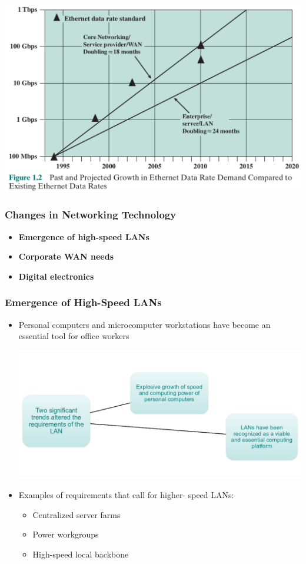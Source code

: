 \documentclass[pdflatex,compress]{beamer}
\begin{document}
\begin{frame}
	\begin{center}
		\includegraphics[height=0.8\textheight]{img/img03}
	\end{center}
\end{frame}

\begin{frame}
	\frametitle{Changes in Networking Technology}
	\begin{itemize}
		\item \textbf{Emergence of high-speed LANs}
		\item \textbf{Corporate WAN needs}
		\item \textbf{Digital electronics}
	\end{itemize}
\end{frame}

\begin{frame}
	\frametitle{Emergence of High-Speed LANs}
	\begin{itemize}
		\item Personal computers and microcomputer workstations have become an essential tool for office workers
		\begin{center}
			\includegraphics[height=0.5\textheight]{img/img04}
		\end{center}
		\item Examples of requirements that call for higher- speed LANs:
		\begin{itemize}
			\item Centralized server farms
			\item Power workgroups
			\item High-speed local backbone
		\end{itemize}
	\end{itemize}
\end{frame}
\end{document}

